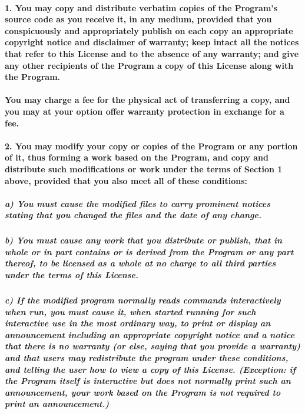 \documentclass[english,letterpaper]{book}
\begin{document}
\paragraph{1. You may copy and distribute verbatim copies of the Program's source
code as you receive it, in any medium, provided that you conspicuously
and appropriately publish on each copy an appropriate copyright notice
and disclaimer of warranty; keep intact all the notices that refer
to this License and to the absence of any warranty; and give any other
recipients of the Program a copy of this License along with the Program.}


\paragraph{You may charge a fee for the physical act of transferring a copy,
and you may at your option offer warranty protection in exchange for
a fee.}


\paragraph{2. You may modify your copy or copies of the Program or any portion
of it, thus forming a work based on the Program, and copy and distribute
such modifications or work under the terms of Section 1 above, provided
that you also meet all of these conditions:}


\subparagraph*{a) You must cause the modified files to carry prominent notices stating
that you changed the files and the date of any change.}


\subparagraph*{b) You must cause any work that you distribute or publish, that in
whole or in part contains or is derived from the Program or any part
thereof, to be licensed as a whole at no charge to all third parties
under the terms of this License.}


\subparagraph{c) If the modified program normally reads commands interactively
when run, you must cause it, when started running for such interactive
use in the most ordinary way, to print or display an announcement
including an appropriate copyright notice and a notice that there
is no warranty (or else, saying that you provide a warranty) and that
users may redistribute the program under these conditions, and telling
the user how to view a copy of this License. (Exception: if the Program
itself is interactive but does not normally print such an announcement,
your work based on the Program is not required to print an announcement.) }
\end{document}
